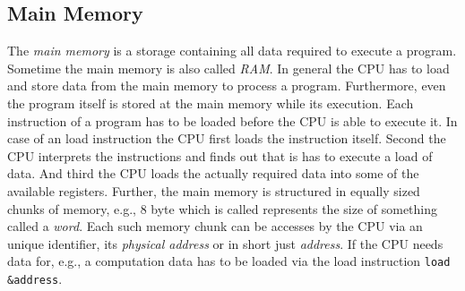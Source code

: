\documentclass[onecolumn, openright, master, english, signatures]{dbrgrptt}
\begin{document}
\subsection{Main Memory}
The \emph{main memory} is a storage containing all data required to execute a program. Sometime the main memory is also called \emph{\ac{RAM}}. In general the CPU has to load and store data from the main memory to process a program. Furthermore, even the program itself is stored at the main memory while its execution. Each instruction of a program has to be loaded before the \ac{CPU} is able to execute it. In case of an load instruction the \ac{CPU} first loads the instruction itself. Second the CPU interprets the instructions and finds out that is has to execute a load of data. And third the \ac{CPU} loads the actually required data into some of the available registers.
Further, the main memory is structured in equally sized chunks of memory, e.g., 8 byte which is called represents the size of something called a \emph{word}. Each such memory chunk can be accesses by the \ac{CPU} via an unique identifier, its \emph{physical address} or in short just \emph{address}. If the CPU needs data for, e.g., a computation data has to be loaded via the load instruction \texttt{load \&address}.
\end{document}
